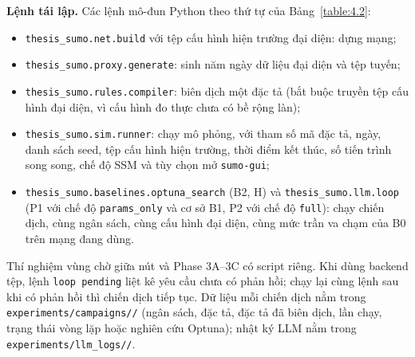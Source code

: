 \documentclass[../DoAn.tex]{subfiles}
\begin{document}
\textbf{Lệnh tái lập.} Các lệnh mô-đun Python theo thứ tự của Bảng~\ref{table:4.2}:
\begin{itemize}
    \item \texttt{thesis\_sumo.net.build} với tệp cấu hình hiện trường đại diện: dựng mạng;
    \item \texttt{thesis\_sumo.proxy.generate}: sinh năm ngày dữ liệu đại diện và tệp tuyến;
    \item \texttt{thesis\_sumo.rules.compiler}: biên dịch một đặc tả (bắt buộc truyền tệp cấu hình đại diện, vì cấu hình đo thực chưa có bề rộng làn);
    \item \texttt{thesis\_sumo.sim.runner}: chạy mô phỏng, với tham số mã đặc tả, ngày, danh sách seed, tệp cấu hình hiện trường, thời điểm kết thúc, số tiến trình song song, chế độ SSM và tùy chọn mở \texttt{sumo-gui};
    \item \texttt{thesis\_sumo.baselines.optuna\_search} (B2, H) và \texttt{thesis\_sumo.llm.loop} (P1 với chế độ \texttt{params\_only} và cơ sở B1, P2 với chế độ \texttt{full}): chạy chiến dịch, cùng ngân sách, cùng cấu hình đại diện, cùng mức trần va chạm của B0 trên mạng đang dùng.
\end{itemize}
Thí nghiệm vùng chờ giữa nút và Phase 3A--3C có script riêng. Khi dùng backend tệp, lệnh \texttt{loop pending} liệt kê yêu cầu chưa có phản hồi; chạy lại cùng lệnh sau khi có phản hồi thì chiến dịch tiếp tục. Dữ liệu mỗi chiến dịch nằm trong \texttt{experiments/\allowbreak campaigns//} (ngân sách, đặc tả, đặc tả đã biên dịch, lần chạy, trạng thái vòng lặp hoặc nghiên cứu Optuna); nhật ký LLM nằm trong \texttt{experiments/\allowbreak llm\_logs//}.
\end{document}
